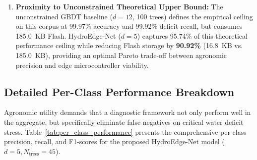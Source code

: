 \begin{enumerate}
    \item \textbf{Proximity to Unconstrained Theoretical Upper Bound:} The unconstrained GBDT baseline ($d=12$, 100 trees) defines the empirical ceiling on this corpus at 99.97\% accuracy and 99.92\% deficit recall, but consumes 185.0~KB Flash. HydroEdge-Net ($d=5$) captures 95.74\% of this theoretical performance ceiling while reducing Flash storage by \textbf{90.92\%} (16.8~KB vs. 185.0~KB), providing an optimal Pareto trade-off between agronomic precision and edge microcontroller viability.
\end{enumerate}

\subsection{Detailed Per-Class Performance Breakdown}

Agronomic utility demands that a diagnostic framework not only perform well in the aggregate, but specifically eliminate false negatives on critical water deficit stress. Table~\ref{tab:per_class_performance} presents the comprehensive per-class precision, recall, and F1-scores for the proposed HydroEdge-Net model ($d=5, N_{\text{trees}}=45$).

\begin{table}[!t]
\caption{Detailed Per-Class Classification Performance of HydroEdge-Net ($N = 3,283$ Test Samples)}
\label{tab:per_class_performance}
\centering
\renewcommand{\arraystretch}{1.25}
\end{table}


